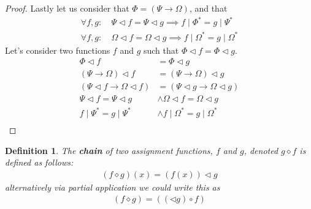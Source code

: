 \documentclass{article}
\newtheorem{defin}{Definition}
\begin{document}
\begin{proof}
Lastly let us consider that $\Phi = (\Psi\rightarrow\Omega)$, and that
\begin{align*}
\forall f,g: & \: \Psi   \lhd f = \Psi   \lhd g \implies f\mid\Phi^\ast  =g\mid\Psi^\ast   \\
\forall f,g: & \: \Omega \lhd f = \Omega \lhd g \implies f\mid\Omega^\ast=g\mid\Omega^\ast
\end{align*}
Let's consider two functions $f$ and $g$ such that $\Phi\lhd f=\Phi\lhd g$.
\begin{align*}
\Phi\lhd f                          &= \Phi\lhd g                              \\
(\Psi\rightarrow\Omega)\lhd f       &= (\Psi\rightarrow\Omega)\lhd g           \\
(\Psi\lhd f\rightarrow\Omega\lhd f) &= (\Psi\lhd g\rightarrow\Omega\lhd g)     \\
\Psi\lhd f = \Psi\lhd g             &\land \Omega\lhd f = \Omega\lhd g         \\
f\mid\Psi^\ast = g\mid\Psi^\ast     &\land f\mid\Omega^\ast = g\mid\Omega^\ast \\
\end{align*}

\end{proof}

\begin{defin}
The \textbf{chain} of two assignment functions, $f$ and $g$, denoted $g \diamond f$ is defined as follows:
\begin{align*}
(f \diamond g) (x) = (f (x)) \lhd g
\end{align*}
alternatively via partial application we could write this as
\begin{align*}
(f \diamond g) = ((\lhd g)\circ f)
\end{align*}
\end{defin}
\end{document}
